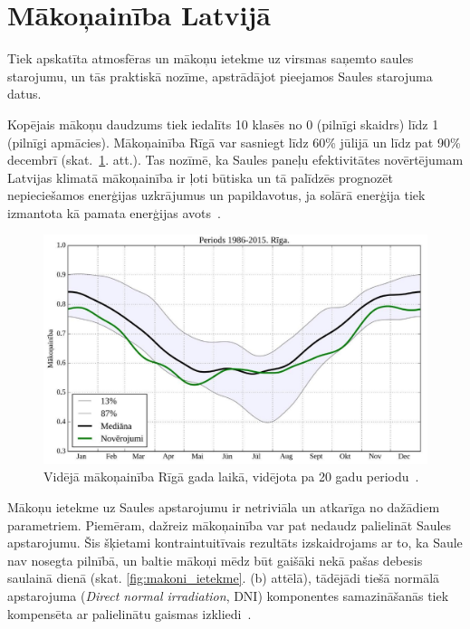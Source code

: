 \section{Mākoņainība Latvijā}\label{section:clouds}

Tiek apskatīta atmosfēras un mākoņu ietekme uz virsmas saņemto saules starojumu, un tās praktiskā nozīme, apstrādājot pieejamos Saules starojuma datus.

Kopējais mākoņu daudzums tiek iedalīts 10 klasēs no 0 (pilnīgi skaidrs) līdz 1 (pilnīgi apmācies). Mākoņainība Rīgā var sasniegt līdz 60\% jūlijā un līdz pat 90\% decembrī (skat.~\ref{fig:makoni_Riga}. att.). Tas nozīmē, ka Saules paneļu efektivitātes novērtējumam Latvijas klimatā mākoņainība ir ļoti būtiska un tā palīdzēs prognozēt nepieciešamos enerģijas uzkrājumus un papildavotus, ja solārā enerģija tiek izmantota kā pamata enerģijas avots~\cite{cloudsModlab}.
\begin{figure}[h]
	\centering
	\includegraphics[width=0.8\linewidth]{figures/misc/makoni_riga.jpg}
	\caption{Vidējā mākoņainība Rīgā gada laikā, vidējota pa 20 gadu periodu~\cite{cloudsModlab}.}
	\label{fig:makoni_Riga}
\end{figure}

Mākoņu ietekme uz Saules apstarojumu ir netriviāla un atkarīga no dažādiem parametriem. Piemēram, dažreiz mākoņainība var pat nedaudz palielināt Saules apstarojumu. Šis šķietami kontraintuitīvais rezultāts izskaidrojams ar to, ka Saule nav nosegta pilnībā, un baltie mākoņi mēdz būt gaišāki nekā pašas debesis saulainā dienā (skat. \ref{fig:makoni_ietekme}. (b) attēlā), tādējādi tiešā normālā apstarojuma (\textit{Direct normal irradiation}, DNI) komponentes samazināšanās tiek kompensēta ar palielinātu gaismas izkliedi~\cite{CloudCoverageImpactOnIrradiance}. 

